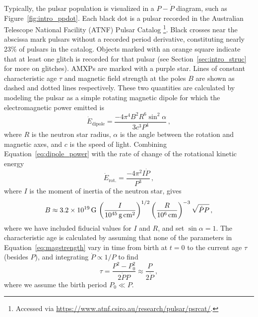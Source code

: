 Typically, the pulsar population is visualized in a $P-\dot{P}$ diagram, such as Figure~\ref{fig:intro_ppdot}. Each black dot is a pulsar recorded in the Australian Telescope National Facility (ATNF) Pulsar Catalog \citep{Manchester2005}\footnote{Accessed via \url{https://www.atnf.csiro.au/research/pulsar/psrcat/}.}. Black crosses near the abscissa mark pulsars without a recorded period derivative, constituting nearly 23\% of pulsars in the catalog. Objects marked with an orange square indicate that at least one glitch is recorded for that pulsar (see Section~\ref{sec:intro_struc} for more on glitches). AMXPs are marked with a purple star. Lines of constant characteristic age $\tau$ and magnetic field strength at the poles $B$ are shown as dashed and dotted lines respectively. These two quantities are calculated by modeling the pulsar as a simple rotating magnetic dipole \citep{Pacini1967,Pacini1968,Gunn1969} for which the electromagnetic power emitted is
\begin{equation}
\dot{E}_\textrm{dipole} = \frac{-4\pi^4B^2R^6\sin^2\alpha}{3c^3 P^4}\,,\label{eq:dipole_power}
\end{equation}
where $R$ is the neutron star radius, $\alpha$ is the angle between the rotation and magnetic axes, and $c$ is the speed of light. Combining Equation~\eqref{eq:dipole_power} with the rate of change of the rotational kinetic energy 
\begin{equation}
\dot{E}_\textrm{rot.} = \frac{-4\pi^2I \dot{P}}{P^3}\,,\label{eq:rot_power} 
\end{equation}
where $I$ is the moment of inertia of the neutron star, gives
\begin{equation}
B \approx 3.2 \times 10^{19}\,\textrm{G}\, \left(\frac{I}{10^{45}\,\textrm{g\,cm}^2}\right)^{1/2} \left(\frac{R}{10^6\,\textrm{cm}}\right)^{-3} \sqrt{\dot{P} P}\,,\label{eq:magstrength}
\end{equation}
where we have included fiducial values for $I$ and $R$, and set $\sin\alpha=1$. The characteristic age is calculated by assuming that none of the parameters in Equation~\eqref{eq:magstrength} vary in time from birth at $t=0$ to the current age $\tau$ (besides $P$), and integrating $\dot{P} \propto 1/P$ to find
\begin{equation}
\tau = \frac{P^2 - P^2_0}{2 \dot{P}P} \approx \frac{P}{2\dot{P}}\,,\label{eq:char_age}
\end{equation}
where we assume the birth period $P_0 \ll P$. 

